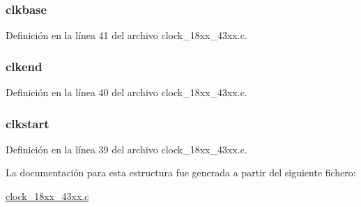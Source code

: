 \subsubsection[{\texorpdfstring{clkbase}{clkbase}}]{ clkbase}\hypertarget{struct_c_l_k___p_e_r_i_p_h___t_o___b_a_s_e___t_a266104e1ff2be86743d22acd6df9b868}{}\label{struct_c_l_k___p_e_r_i_p_h___t_o___b_a_s_e___t_a266104e1ff2be86743d22acd6df9b868}


Definición en la línea 41 del archivo clock\+\_\+18xx\+\_\+43xx.\+c.

\subsubsection[{\texorpdfstring{clkend}{clkend}}]{ clkend}\hypertarget{struct_c_l_k___p_e_r_i_p_h___t_o___b_a_s_e___t_a946dd64e2f5d1015b2d21a38d81e204f}{}\label{struct_c_l_k___p_e_r_i_p_h___t_o___b_a_s_e___t_a946dd64e2f5d1015b2d21a38d81e204f}


Definición en la línea 40 del archivo clock\+\_\+18xx\+\_\+43xx.\+c.

\subsubsection[{\texorpdfstring{clkstart}{clkstart}}]{ clkstart}\hypertarget{struct_c_l_k___p_e_r_i_p_h___t_o___b_a_s_e___t_a3bd5456974c499da03a33f0a2c6dba86}{}\label{struct_c_l_k___p_e_r_i_p_h___t_o___b_a_s_e___t_a3bd5456974c499da03a33f0a2c6dba86}


Definición en la línea 39 del archivo clock\+\_\+18xx\+\_\+43xx.\+c.



La documentación para esta estructura fue generada a partir del siguiente fichero\+:\begin{DoxyCompactItemize}
\item 
\hyperlink{clock__18xx__43xx_8c}{clock\+\_\+18xx\+\_\+43xx.\+c}\end{DoxyCompactItemize}
